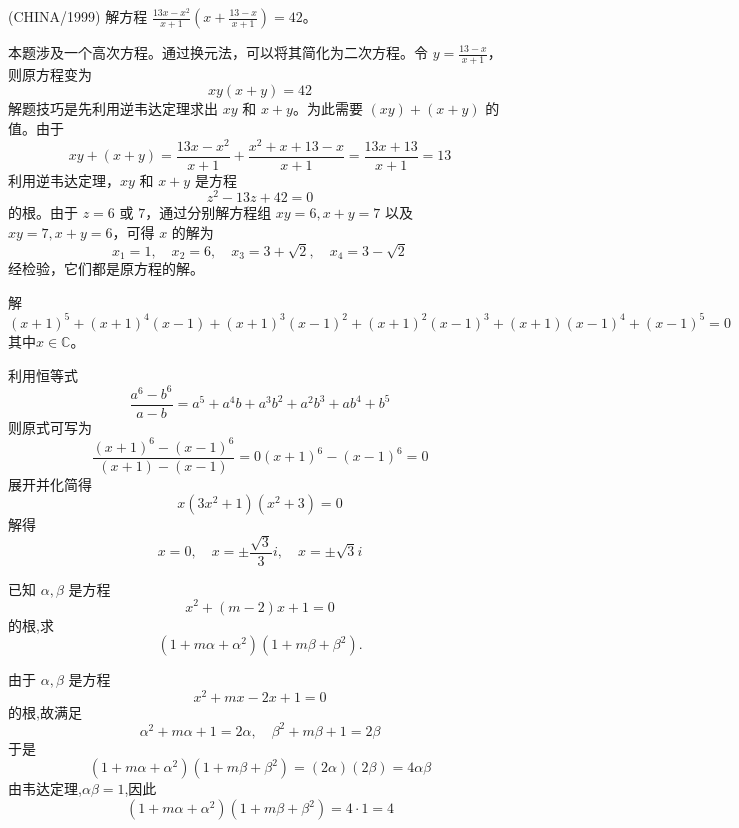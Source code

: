 \begin{questions}
\question (CHINA/1999) 解方程 $\frac{13x - x^2}{x + 1} \left( x + \frac{13 - x}{x + 1} \right) = 42$。

\begin{solution}
本题涉及一个高次方程。通过换元法，可以将其简化为二次方程。令 $y = \frac{13 - x}{x + 1}$，则原方程变为
\[
xy(x + y) = 42
\]
解题技巧是先利用逆韦达定理求出 $xy$ 和 $x + y$。为此需要 $(xy) + (x + y)$ 的值。由于
\[
xy + (x + y) = \frac{13x - x^2}{x + 1} + \frac{x^2 + x + 13 - x}{x + 1} = \frac{13x + 13}{x + 1} = 13
\]
利用逆韦达定理，$xy$ 和 $x + y$ 是方程
\[
z^2 - 13z + 42 = 0
\]
的根。由于 $z = 6$ 或 $7$，通过分别解方程组 $xy = 6, x + y = 7$ 以及 $xy = 7, x + y = 6$，可得 $x$ 的解为
\[
x_1 = 1, \quad x_2 = 6, \quad x_3 = 3 + \sqrt{2}, \quad x_4 = 3 - \sqrt{2}
\]
经检验，它们都是原方程的解。
\end{solution}

    \question 解
    \[
    (x+1)^5+(x+1)^4(x-1)+(x+1)^3(x-1)^2+(x+1)^2(x-1)^3+(x+1)(x-1)^4+(x-1)^5=0
    \]
    其中$x \in \mathbb{C}$。
    \begin{solution}
        利用恒等式
        \[
        \frac{a^6-b^6}{a-b}=a^5+a^4b+a^3b^2+a^2b^3+ab^4+b^5
        \]
        则原式可写为
        \[
        \frac{(x+1)^6-(x-1)^6}{(x+1)-(x-1)}=0 (x+1)^6-(x-1)^6=0
        \]
        展开并化简得
        \[
        x(3x^2+1)(x^2+3)=0
        \]
        解得
        \[
        x=0,\quad x=\pm\frac{\sqrt{3}}{3}i,\quad x=\pm\sqrt{3}i
        \]
    \end{solution}

    \question 已知 $\alpha,\beta$ 是方程
    \[
    x^2 + (m-2)x + 1 = 0
    \]
    的根,求
    \[
    (1 + m\alpha + \alpha^2)(1 + m\beta + \beta^2).
    \]
    \begin{solution}
        由于 $\alpha,\beta$ 是方程
        \[
        x^2 + mx - 2x + 1 = 0
        \]
        的根,故满足
        \[
        \alpha^2 + m\alpha + 1 = 2\alpha,\quad 
        \beta^2 + m\beta + 1 = 2\beta
        \]
        于是
        \[
        (1 + m\alpha + \alpha^2)(1 + m\beta + \beta^2)  = (2\alpha)(2\beta) = 4\alpha\beta
        \]
        由韦达定理,$\alpha\beta = 1$,因此
        \[
        (1 + m\alpha + \alpha^2)(1 + m\beta + \beta^2) = 4 \cdot 1 = 4
        \]
    \end{solution}


\end{questions}
